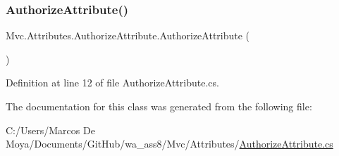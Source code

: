 \subsubsection{\texorpdfstring{Authorize\+Attribute()}{AuthorizeAttribute()}}
{\footnotesize\ttfamily Mvc.\+Attributes.\+Authorize\+Attribute.\+Authorize\+Attribute (\begin{DoxyParamCaption}{ }\end{DoxyParamCaption})}



Definition at line 12 of file Authorize\+Attribute.\+cs.



The documentation for this class was generated from the following file\+:\begin{DoxyCompactItemize}
\item 
C\+:/\+Users/\+Marcos De Moya/\+Documents/\+Git\+Hub/wa\+\_\+ass8/\+Mvc/\+Attributes/\hyperlink{_authorize_attribute_8cs}{Authorize\+Attribute.\+cs}\end{DoxyCompactItemize}
